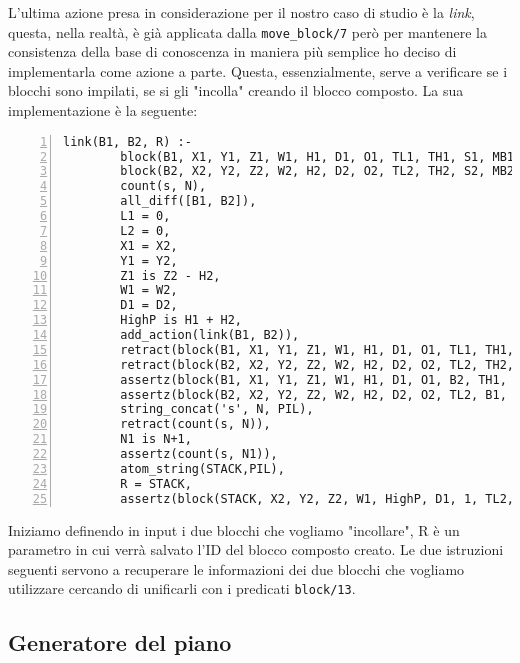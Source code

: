 L'ultima azione presa in considerazione per il nostro caso di studio è la \textit{link}, questa, nella realtà, è già applicata dalla \verb+move_block/7+ però per mantenere la consistenza della base di conoscenza in maniera più semplice ho deciso di implementarla come azione a parte. Questa, essenzialmente, serve a verificare se i blocchi sono impilati, se si gli "incolla" creando il blocco composto. La sua implementazione è la seguente:
\begin{Verbatim}[numbers=left]
    link(B1, B2, R) :-
        block(B1, X1, Y1, Z1, W1, H1, D1, O1, TL1, TH1, S1, MB1, L1),
        block(B2, X2, Y2, Z2, W2, H2, D2, O2, TL2, TH2, S2, MB2, L2),
        count(s, N),
        all_diff([B1, B2]),
        L1 = 0,
        L2 = 0,
        X1 = X2,
        Y1 = Y2,
        Z1 is Z2 - H2,
        W1 = W2,
        D1 = D2,
        HighP is H1 + H2,
        add_action(link(B1, B2)),
        retract(block(B1, X1, Y1, Z1, W1, H1, D1, O1, TL1, TH1, S1, MB1, L1)),
        retract(block(B2, X2, Y2, Z2, W2, H2, D2, O2, TL2, TH2, S2, MB2, L2)),
        assertz(block(B1, X1, Y1, Z1, W1, H1, D1, O1, B2, TH1, S1, MB1, 1)),
        assertz(block(B2, X2, Y2, Z2, W2, H2, D2, O2, TL2, B1, S2, MB2, 1)),
        string_concat('s', N, PIL),
        retract(count(s, N)),
        N1 is N+1,
        assertz(count(s, N1)),
        atom_string(STACK,PIL),
        R = STACK,
        assertz(block(STACK, X2, Y2, Z2, W1, HighP, D1, 1, TL2, TH1, block, [B1,B2],0)).
\end{Verbatim}
Iniziamo definendo in input i due blocchi che vogliamo "incollare", R è un parametro in cui verrà salvato l'ID del blocco composto creato.
Le due istruzioni seguenti servono a recuperare le informazioni dei due blocchi che vogliamo utilizzare cercando di unificarli con i predicati \verb+block/13+.
\subsection{Generatore del piano}
\label{subsec:generatorepiano}

